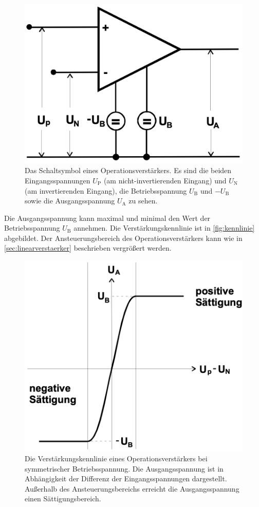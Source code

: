 \begin{figure}
    \centering
    \includegraphics[width=0.5\linewidth]{./figures/OPV.png}
    \caption{Das Schaltsymbol eines Operationsverstärkers. Es sind die beiden Eingangsspannungen $U_\text{P}$ (am nicht-invertierenden Eingang) und $U_\text{N}$ (am invertierenden Eingang), die Betriebsspannung $U_\text{B}$ und $-U_\text{B}$ sowie die Ausgangsspannung $U_\text{A}$ zu sehen. \cite{V51old}}
    \label{fig:OPV}
\end{figure}


Die Ausgangsspannung kann maximal und minimal den Wert der Betriebsspannung $U_\text{B}$ annehmen. Die Verstärkungskennlinie ist in \autoref{fig:kennlinie} abgebildet. Der Ansteuerungsbereich des Operationsverstärkers kann wie in \autoref{sec:linearverstaerker} beschrieben vergrößert werden.

\begin{figure}
    \centering
    \includegraphics[width=0.5\linewidth]{./figures/Kennlinie.png}
    \caption{Die Verstärkungskennlinie eines Operationsverstärkers bei symmetrischer Betriebsspannung. Die Ausgangsspannung ist in Abhängigkeit der Differenz der Eingangsspannungen dargestellt. Außerhalb des Ansteuerungsbereichs erreicht die Ausgangsspannung einen Sättigungsbereich. \cite{V51old}} 
    \label{fig:kennlinie}
\end{figure}



